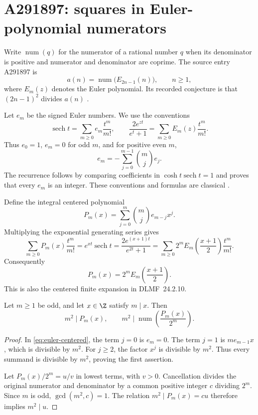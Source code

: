 \section{A291897: squares in Euler-polynomial numerators}

Write $\operatorname{num}(q)$ for the numerator of a rational number $q$
when its denominator is positive and numerator and denominator are coprime.
The source entry A291897 is
\[
 a(n)=\operatorname{num}\bigl(E_{2n-1}(n)\bigr),\qquad n\ge1,
\]
where $E_m(z)$ denotes the Euler polynomial. Its recorded conjecture is
that $(2n-1)^2$ divides $a(n)$ \cite{a291897-source}.

Let $e_m$ be the signed Euler numbers. We use the conventions
\[
 \operatorname{sech}t=\sum_{m\ge0}e_m\frac{t^m}{m!},\qquad
 \frac{2e^{zt}}{e^t+1}=\sum_{m\ge0}E_m(z)\frac{t^m}{m!}.
\]
Thus $e_0=1$, $e_m=0$ for odd $m$, and for positive even $m$,
\[
 e_m=-\sum_{j=0}^{m-1}\binom mj e_j.
\]
The recurrence follows by comparing coefficients in
$\cosh t\operatorname{sech}t=1$ and proves that every $e_m$ is an integer.
These conventions and formulas are classical \cite{a291897-dlmf,a291897-carlitz}.

Define the integral centered polynomial
\begin{equation}\label{eq:euler-centered}
 P_m(x)=\sum_{j=0}^m\binom mj e_{m-j}x^j.
\end{equation}
Multiplying the exponential generating series gives
\[
 \sum_{m\ge0}P_m(x)\frac{t^m}{m!}
 =e^{xt}\operatorname{sech}t
 =\frac{2e^{(x+1)t}}{e^{2t}+1}
 =\sum_{m\ge0}2^m E_m\!\left(\frac{x+1}{2}\right)\frac{t^m}{m!}.
\]
Consequently
\begin{equation}\label{eq:euler-convention}
 P_m(x)=2^mE_m\!\left(\frac{x+1}{2}\right).
\end{equation}
This is also the centered finite expansion in DLMF~24.2.10.

\begin{theorem}\label{thm:euler-general}
Let $m\ge1$ be odd, and let $x\in\Z$ satisfy $m\mid x$. Then
\[
 m^2\mid P_m(x),\qquad
 m^2\mid\operatorname{num}\!\left(\frac{P_m(x)}{2^m}\right).
\]
\end{theorem}

\begin{proof}
In \eqref{eq:euler-centered}, the term $j=0$ is $e_m=0$.
The term $j=1$ is $m e_{m-1}x$, which is divisible by $m^2$.
For $j\ge2$, the factor $x^j$ is divisible by $m^2$.
Thus every summand is divisible by $m^2$, proving the first assertion.

Let $P_m(x)/2^m=u/v$ in lowest terms, with $v>0$. Cancellation
divides the original numerator and denominator by a common positive
integer $c$ dividing $2^m$. Since $m$ is odd, $\gcd(m^2,c)=1$.
The relation $m^2\mid P_m(x)=cu$ therefore implies $m^2\mid u$.
\end{proof}

